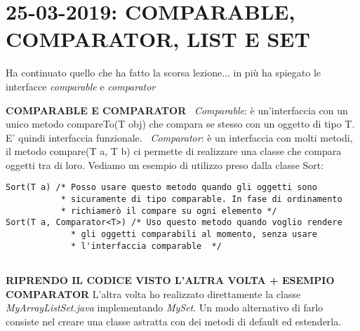

\newpage
\section{25-03-2019: COMPARABLE, COMPARATOR, LIST E SET}
\noindent Ha continuato quello che ha fatto la scorsa lezione... in più ha spiegato le interfacce \textit{comparable} e \textit{comparator} \newline 

\noindent \textbf{COMPARABLE E COMPARATOR}\newline
\textbullet\ \textit{Comparable}: è un'interfaccia con un unico metodo compareTo(T obj) che compara se stesso con un oggetto di tipo T. E' quindi interfaccia funzionale. \newline
\textbullet\ \textit{Comparator}: è un interfaccia con molti metodi, il metodo compare(T a, T b) ci permette di realizzare una classe che compara oggetti tra di loro. \newline
Vediamo un esempio di utilizzo preso dalla classe Sort: \newline
\begin{lstlisting}[basicstyle=\small,]
Sort(T a) /* Posso usare questo metodo quando gli oggetti sono 
		   * sicuramente di tipo comparable. In fase di ordinamento
		   * richiamerò il compare su ogni elemento */
Sort(T a, Comparator<T>) /* Uso questo metodo quando voglio rendere
		     * gli oggetti comparabili al momento, senza usare
		     * l'interfaccia comparable  */
		     
\end{lstlisting}

\noindent \textbf{RIPRENDO IL CODICE VISTO L'ALTRA VOLTA + ESEMPIO COMPARATOR}\newline
L'altra volta ho realizzato direttamente la classe \textit{MyArrayListSet.java} implementando \textit{MySet}.
Un modo alternativo di farlo consiste nel creare una classe astratta con dei metodi di default ed estenderla. 

